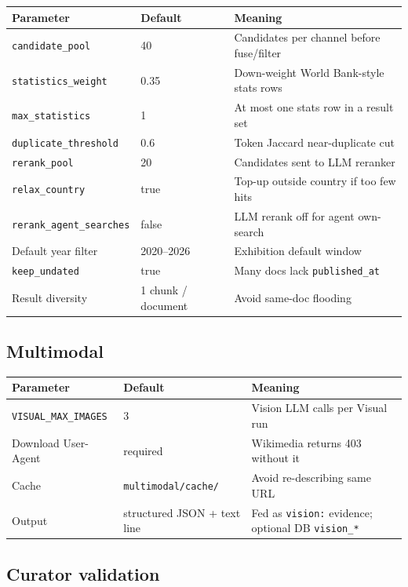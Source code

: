 \documentclass[11pt,a4paper]{article}
\begin{document}
\begin{tabular}{@{}llp{7.2cm}@{}}
\toprule
\textbf{Parameter} & \textbf{Default} & \textbf{Meaning} \\
\midrule
\texttt{candidate\_pool} & 40 & Candidates per channel before fuse/filter \\
\texttt{statistics\_weight} & 0.35 & Down-weight World Bank-style stats rows \\
\texttt{max\_statistics} & 1 & At most one stats row in a result set \\
\texttt{duplicate\_threshold} & 0.6 & Token Jaccard near-duplicate cut \\
\texttt{rerank\_pool} & 20 & Candidates sent to LLM reranker \\
\texttt{relax\_country} & true & Top-up outside country if too few hits \\
\texttt{rerank\_agent\_searches} & false & LLM rerank off for agent own-search \\
Default year filter & 2020--2026 & Exhibition default window \\
\texttt{keep\_undated} & true & Many docs lack \texttt{published\_at} \\
Result diversity & 1 chunk / document & Avoid same-doc flooding \\
\bottomrule
\end{tabular}

\subsection{Multimodal}

\begin{tabular}{@{}llp{7.5cm}@{}}
\toprule
\textbf{Parameter} & \textbf{Default} & \textbf{Meaning} \\
\midrule
\texttt{VISUAL\_MAX\_IMAGES} & 3 & Vision LLM calls per Visual run \\
Download User-Agent & required & Wikimedia returns 403 without it \\
Cache & \texttt{multimodal/cache/} & Avoid re-describing same URL \\
Output & structured JSON + text line & Fed as \texttt{vision:} evidence; optional DB \texttt{vision\_*} \\
\bottomrule
\end{tabular}

\subsection{Curator validation}
\end{document}
